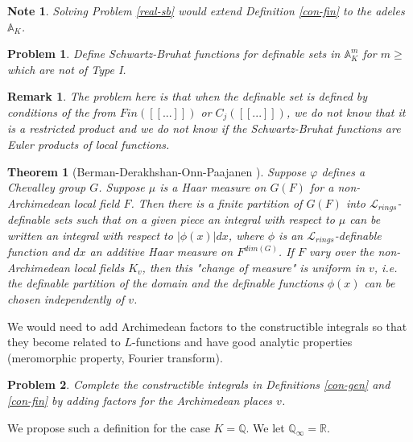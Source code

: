\documentclass[12pt]{amsart}
\def\A{\mathbb{A}}
\def\R{\mathbb{R}}
\def\cL{\mathcal{L}}
\def\R{\mathbb{R}}
\def\Q{\mathbb{Q}}
\def\cL{\mathcal{L}}
\newtheorem{thm}{Theorem}[section]
\newtheorem{remark}{Remark}[section]
\numberwithin{equation}{section}
\newtheorem{prob}{Problem}[section]
\newtheorem{note}{Note}[section]
\begin{document}
\begin{note} Solving Problem \ref{real-sb} would extend Definition \ref{con-fin} to the adeles $\A_K$.\end{note}

\begin{prob} Define Schwartz-Bruhat functions for definable sets in $\A_K^m$ for $m\geq$ which are not of Type I.
\end{prob}
\begin{remark} The problem here is that when the definable set 
is defined by conditions of the from $Fin([[...]])$ or $C_j([[...]])$, we do not know that it is a restricted product and we do not know if the Schwartz-Bruhat functions are Euler products of local functions.\end{remark}

\begin{thm}[Berman-Derakhshan-Onn-Paajanen {\cite[Theorem A]{BDOP}}]\label{change-of-meas} Suppose $\varphi$ defines a Chevalley group $G$. Suppose $\mu$ is a Haar measure on $G(F)$ for a non-Archimedean local field $F$. Then there is a finite partition of $G(F)$ into 
$\cL_{rings}$-definable sets such that on a given piece an integral with respect to 
$\mu$ can be written an integral with respect to $|\phi(x)|dx$, where $\phi$ is an $\cL_{rings}$-definable function and $dx$ an 
additive Haar measure on $F^{dim(G)}$. 
If $F$ vary over the non-Archimedean local fields $K_v$, then this "change of measure" is uniform in $v$, i.e. the definable partition of the domain and the definable functions $\phi(x)$ can be chosen independently of $v$.
\end{thm}

We would need to add Archimedean factors to the constructible integrals so that they become related to $L$-functions and have good analytic properties (meromorphic property, Fourier transform). 

\begin{prob}\label{con-fin-comp} Complete the constructible integrals in Definitions \ref{con-gen} and \ref{con-fin} by adding factors for the Archimedean places $v$.
\end{prob}

We propose such a definition for the case $K=\Q$. We let $\Q_{\infty}=\R$. 
\end{document}
